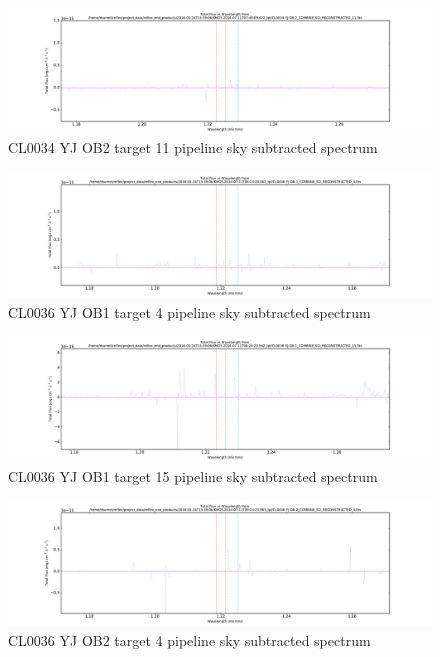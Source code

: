 \documentclass[10pt,letterpaper]{article}
\begin{document}
\begin{figure}[h!]
\caption{CL0034 YJ OB2 target 11 pipeline sky subtracted spectrum}\label{fig:CL0034 YJ OB2 target 11 pipeline sky subtracted spectrum}
\includegraphics[scale=0.4]{figures/CL0034-YJ-OB-2_COMBINE_SCI_RECONSTRUCTED_11.pdf}
\end{figure}
\begin{figure}[h!]
\caption{CL0036 YJ OB1 target 4 pipeline sky subtracted spectrum}\label{fig:CL0036 YJ OB1 target 4 pipeline sky subtracted spectrum}
\includegraphics[scale=0.4]{figures/CL0036-YJ-OB-1_COMBINE_SCI_RECONSTRUCTED_4.pdf}
\end{figure}
\begin{figure}[h!]
\caption{CL0036 YJ OB1 target 15 pipeline sky subtracted spectrum}\label{fig:CL0036 YJ OB1 target 15 pipeline sky subtracted spectrum}
\includegraphics[scale=0.4]{figures/CL0036-YJ-OB-1_COMBINE_SCI_RECONSTRUCTED_15.pdf}
\end{figure}
\begin{figure}[h!]
\caption{CL0036 YJ OB2 target 4 pipeline sky subtracted spectrum}\label{fig:CL0036 YJ OB2 target 4 pipeline sky subtracted spectrum}
\includegraphics[scale=0.4]{figures/CL0036-YJ-OB-2_COMBINE_SCI_RECONSTRUCTED_4.pdf}
\end{figure}
\end{document}
